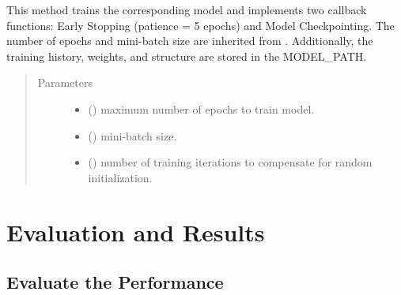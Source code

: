 \documentclass[letterpaper,10pt,english]{sphinxmanual}
\begin{document}
\begin{fulllineitems}
\begin{fulllineitems}
\end{fulllineitems}


\begin{fulllineitems}
\label{\detokenize{train:train.Trainer.train}}
This method trains the corresponding model and implements two callback
functions: Early Stopping (patience = 5 epochs) and Model Checkpointing. The number of epochs and
mini-batch size are inherited from . Additionally, the training history, weights, and 
structure are stored in the MODEL\_PATH.
\begin{quote}\begin{description}
\item[{Parameters}] \leavevmode\begin{itemize}
\item {} 
 () \textendash{} maximum number of epochs to train model.

\item {} 
 () \textendash{} mini-batch size.

\item {} 
 () \textendash{} number of training iterations to compensate for random initialization.

\end{itemize}

\end{description}\end{quote}

\end{fulllineitems}


\end{fulllineitems}



\chapter{Evaluation and Results}
\label{\detokenize{index:evaluation-and-results}}

\section{Evaluate the Performance}
\label{\detokenize{evaluate:evaluate-the-performance}}\label{\detokenize{evaluate::doc}}
\end{document}
